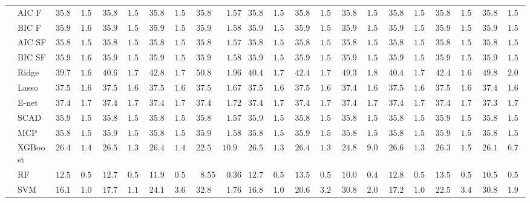 \begin{tabular}{ll|ll|llllll|llllll|llllll}
	& AIC F  & $35.83$ & $1.56$ & $35.82$ & $1.56$ & $35.83$ & $1.56$ & $35.84$ & $\phantom{0}1.57$ & $35.83$ & $1.56$ & $35.83$ & $1.56$ & $35.85$ & $1.56$ & $35.83$ & $1.56$ & $35.83$ & $1.57$ & $35.84$ & $1.56$ \\
	& BIC F  & $35.95$ & $1.60$ & $35.95$ & $1.57$ & $35.94$ & $1.57$ & $35.93$ & $\phantom{0}1.58$ & $35.93$ & $1.57$ & $35.95$ & $1.56$ & $35.94$ & $1.58$ & $35.94$ & $1.58$ & $35.95$ & $1.57$ & $35.95$ & $1.57$ \\
	& AIC SF  & $35.83$ & $1.56$ & $35.82$ & $1.56$ & $35.83$ & $1.56$ & $35.84$ & $\phantom{0}1.57$ & $35.83$ & $1.56$ & $35.83$ & $1.56$ & $35.85$ & $1.56$ & $35.83$ & $1.56$ & $35.83$ & $1.57$ & $35.84$ & $1.56$ \\
	& BIC SF  & $35.95$ & $1.60$ & $35.95$ & $1.57$ & $35.94$ & $1.57$ & $35.93$ & $\phantom{0}1.58$ & $35.93$ & $1.57$ & $35.95$ & $1.56$ & $35.94$ & $1.58$ & $35.94$ & $1.58$ & $35.95$ & $1.57$ & $35.95$ & $1.57$ \\
	& Ridge  & $39.78$ & $1.68$ & $40.64$ & $1.76$ & $42.89$ & $1.78$ & $50.87$ & $\phantom{0}1.96$ & $40.45$ & $1.73$ & $42.46$ & $1.73$ & $49.34$ & $1.89$ & $40.43$ & $1.70$ & $42.46$ & $1.68$ & $49.89$ & $2.00$ \\
	& Lasso  & $37.54$ & $1.68$ & $37.51$ & $1.67$ & $37.51$ & $1.66$ & $37.51$ & $\phantom{0}1.67$ & $37.52$ & $1.66$ & $37.50$ & $1.66$ & $37.46$ & $1.66$ & $37.52$ & $1.66$ & $37.50$ & $1.67$ & $37.44$ & $1.67$ \\
	& E-net  & $37.48$ & $1.75$ & $37.46$ & $1.71$ & $37.45$ & $1.71$ & $37.44$ & $\phantom{0}1.72$ & $37.46$ & $1.73$ & $37.44$ & $1.73$ & $37.40$ & $1.71$ & $37.46$ & $1.73$ & $37.44$ & $1.71$ & $37.38$ & $1.73$ \\
	& SCAD  & $35.90$ & $1.57$ & $35.89$ & $1.58$ & $35.89$ & $1.57$ & $35.88$ & $\phantom{0}1.57$ & $35.90$ & $1.57$ & $35.88$ & $1.58$ & $35.87$ & $1.57$ & $35.89$ & $1.58$ & $35.90$ & $1.58$ & $35.89$ & $1.58$ \\
	& MCP  & $35.89$ & $1.57$ & $35.90$ & $1.58$ & $35.89$ & $1.58$ & $35.90$ & $\phantom{0}1.58$ & $35.89$ & $1.57$ & $35.91$ & $1.58$ & $35.88$ & $1.58$ & $35.89$ & $1.57$ & $35.90$ & $1.57$ & $35.88$ & $1.56$ \\
	& XGBoost  & $26.42$ & $1.46$ & $26.50$ & $1.30$ & $26.47$ & $1.43$ & $22.57$ & $10.98$ & $26.52$ & $1.35$ & $26.43$ & $1.39$ & $24.88$ & $9.02$ & $26.62$ & $1.33$ & $26.37$ & $1.56$ & $26.19$ & $6.76$ \\
	& RF  & $12.54$ & $0.51$ & $12.79$ & $0.56$ & $11.97$ & $0.54$ & $\phantom{0}8.55$ & $\phantom{0}0.36$ & $12.75$ & $0.50$ & $13.53$ & $0.52$ & $10.04$ & $0.45$ & $12.83$ & $0.53$ & $13.57$ & $0.56$ & $10.55$ & $0.50$ \\
	& SVM  & $16.16$ & $1.04$ & $17.72$ & $1.11$ & $24.16$ & $3.62$ & $32.84$ & $\phantom{0}1.76$ & $16.81$ & $1.08$ & $20.60$ & $3.25$ & $30.84$ & $2.09$ & $17.26$ & $1.03$ & $22.55$ & $3.45$ & $30.80$ & $1.94$ \\
	\hline 
\end{tabular}